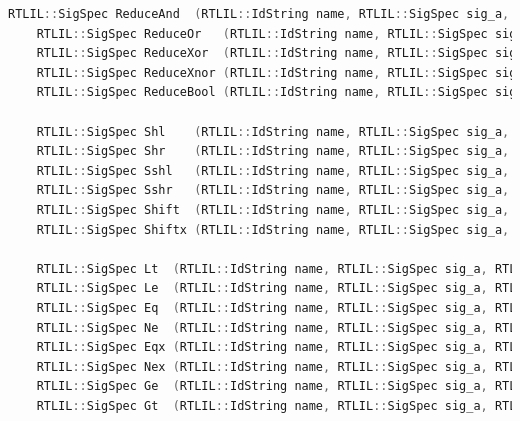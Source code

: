 \documentclass[11pt]{report}
\begin{document}
\begin{lstlisting}[language=C++]
	RTLIL::SigSpec ReduceAnd  (RTLIL::IdString name, RTLIL::SigSpec sig_a, bool is_signed = false, const std::string &src = "");
	RTLIL::SigSpec ReduceOr   (RTLIL::IdString name, RTLIL::SigSpec sig_a, bool is_signed = false, const std::string &src = "");
	RTLIL::SigSpec ReduceXor  (RTLIL::IdString name, RTLIL::SigSpec sig_a, bool is_signed = false, const std::string &src = "");
	RTLIL::SigSpec ReduceXnor (RTLIL::IdString name, RTLIL::SigSpec sig_a, bool is_signed = false, const std::string &src = "");
	RTLIL::SigSpec ReduceBool (RTLIL::IdString name, RTLIL::SigSpec sig_a, bool is_signed = false, const std::string &src = "");

	RTLIL::SigSpec Shl    (RTLIL::IdString name, RTLIL::SigSpec sig_a, RTLIL::SigSpec sig_b, bool is_signed = false, const std::string &src = "");
	RTLIL::SigSpec Shr    (RTLIL::IdString name, RTLIL::SigSpec sig_a, RTLIL::SigSpec sig_b, bool is_signed = false, const std::string &src = "");
	RTLIL::SigSpec Sshl   (RTLIL::IdString name, RTLIL::SigSpec sig_a, RTLIL::SigSpec sig_b, bool is_signed = false, const std::string &src = "");
	RTLIL::SigSpec Sshr   (RTLIL::IdString name, RTLIL::SigSpec sig_a, RTLIL::SigSpec sig_b, bool is_signed = false, const std::string &src = "");
	RTLIL::SigSpec Shift  (RTLIL::IdString name, RTLIL::SigSpec sig_a, RTLIL::SigSpec sig_b, bool is_signed = false, const std::string &src = "");
	RTLIL::SigSpec Shiftx (RTLIL::IdString name, RTLIL::SigSpec sig_a, RTLIL::SigSpec sig_b, bool is_signed = false, const std::string &src = "");

	RTLIL::SigSpec Lt  (RTLIL::IdString name, RTLIL::SigSpec sig_a, RTLIL::SigSpec sig_b, bool is_signed = false, const std::string &src = "");
	RTLIL::SigSpec Le  (RTLIL::IdString name, RTLIL::SigSpec sig_a, RTLIL::SigSpec sig_b, bool is_signed = false, const std::string &src = "");
	RTLIL::SigSpec Eq  (RTLIL::IdString name, RTLIL::SigSpec sig_a, RTLIL::SigSpec sig_b, bool is_signed = false, const std::string &src = "");
	RTLIL::SigSpec Ne  (RTLIL::IdString name, RTLIL::SigSpec sig_a, RTLIL::SigSpec sig_b, bool is_signed = false, const std::string &src = "");
	RTLIL::SigSpec Eqx (RTLIL::IdString name, RTLIL::SigSpec sig_a, RTLIL::SigSpec sig_b, bool is_signed = false, const std::string &src = "");
	RTLIL::SigSpec Nex (RTLIL::IdString name, RTLIL::SigSpec sig_a, RTLIL::SigSpec sig_b, bool is_signed = false, const std::string &src = "");
	RTLIL::SigSpec Ge  (RTLIL::IdString name, RTLIL::SigSpec sig_a, RTLIL::SigSpec sig_b, bool is_signed = false, const std::string &src = "");
	RTLIL::SigSpec Gt  (RTLIL::IdString name, RTLIL::SigSpec sig_a, RTLIL::SigSpec sig_b, bool is_signed = false, const std::string &src = "");


\end{lstlisting}
\end{document}
